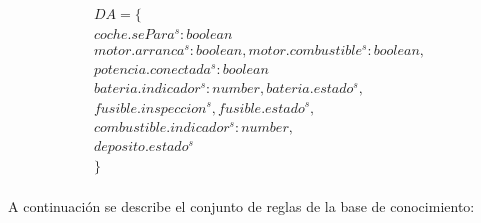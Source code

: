 \documentclass[10pt, a4paper,spanish]{article}
\begin{document}
		\begin{multline*}
			DA = \{ \\
				coche.sePara^s:boolean \\
				motor.arranca^s:boolean, motor.combustible^s:boolean, \\
				potencia.conectada^s:boolean \\
				bateria.indicador^s:number, bateria.estado^s,\\
				fusible.inspeccion^s, fusible.estado^s, \\
				combustible.indicador^s:number, \\
				deposito.estado^s \\
			\}
		\end{multline*}

		\paragraph{}
		A continuación se describe el conjunto de reglas de la base de conocimiento:
\end{document}

